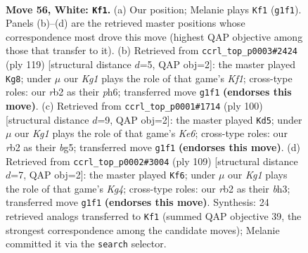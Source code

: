 \documentclass[11pt]{article}
\begin{document}
\clearpage

\begin{figure}[p]\centering
\begin{subfigure}{0.46\textwidth}\centering
\resizebox{\linewidth}{!}{%
\newchessgame
\chessboard[
  setfen={4k3/8/8/4p1p1/5p2/5B2/1r6/6K1 w - - 23 56},
  showmover=false,
  pgfstyle=straightmove, color=movearrow, markmove={g1-f1}
]}
\caption{}
\end{subfigure}\hfill
\begin{subfigure}{0.46\textwidth}\centering
\resizebox{\linewidth}{!}{%
\newchessgame
\chessboard[
  setfen={5k2/8/4K2P/6P1/5P2/8/1b6/8 b - - 0 60},
  showmover=false,
  pgfstyle=straightmove, color=movearrow, markmove={f8-g8}
]}
\caption{}
\end{subfigure}
\\[4pt]
\begin{subfigure}{0.46\textwidth}\centering
\resizebox{\linewidth}{!}{%
\newchessgame
\chessboard[
  setfen={8/7k/4K3/1p4b1/2pB4/8/8/8 w - - 6 51},
  showmover=false,
  pgfstyle=straightmove, color=movearrow, markmove={e6-d5}
]}
\caption{}
\end{subfigure}\hfill
\begin{subfigure}{0.46\textwidth}\centering
\resizebox{\linewidth}{!}{%
\newchessgame
\chessboard[
  setfen={8/8/1b1p4/1P1P2k1/2P5/5K1B/8/8 b - - 0 55},
  showmover=false,
  pgfstyle=straightmove, color=movearrow, markmove={g5-f6}
]}
\caption{}
\end{subfigure}
\caption{\textbf{Move 56, White: \texttt{Kf1}.} (a) Our position; Melanie plays \texttt{Kf1} (\texttt{g1f1}). Panels (b)--(d) are the retrieved master positions whose correspondence most drove this move (highest QAP objective among those that transfer to it). (b) Retrieved from \texttt{ccrl\_top\_p0003\#2424} (ply 119) [structural distance $d$=5, QAP obj=2]: the master played \texttt{Kg8}; under $\mu$ our \emph{Kg1} plays the role of that game's \emph{Kf1}; cross-type roles: our \emph{r}b2 as their \emph{p}h6; transferred move \texttt{g1f1} \textbf{(endorses this move)}. (c) Retrieved from \texttt{ccrl\_top\_p0001\#1714} (ply 100) [structural distance $d$=9, QAP obj=2]: the master played \texttt{Kd5}; under $\mu$ our \emph{Kg1} plays the role of that game's \emph{Ke6}; cross-type roles: our \emph{r}b2 as their \emph{b}g5; transferred move \texttt{g1f1} \textbf{(endorses this move)}. (d) Retrieved from \texttt{ccrl\_top\_p0002\#3004} (ply 109) [structural distance $d$=7, QAP obj=2]: the master played \texttt{Kf6}; under $\mu$ our \emph{Kg1} plays the role of that game's \emph{Kg4}; cross-type roles: our \emph{r}b2 as their \emph{b}h3; transferred move \texttt{g1f1} \textbf{(endorses this move)}. Synthesis: 24 retrieved analogs transferred to \texttt{Kf1} (summed QAP objective 39, the strongest correspondence among the candidate moves); Melanie committed it via the \texttt{search} selector.}
\label{fig:thought-m110}
\end{figure}
\end{document}
